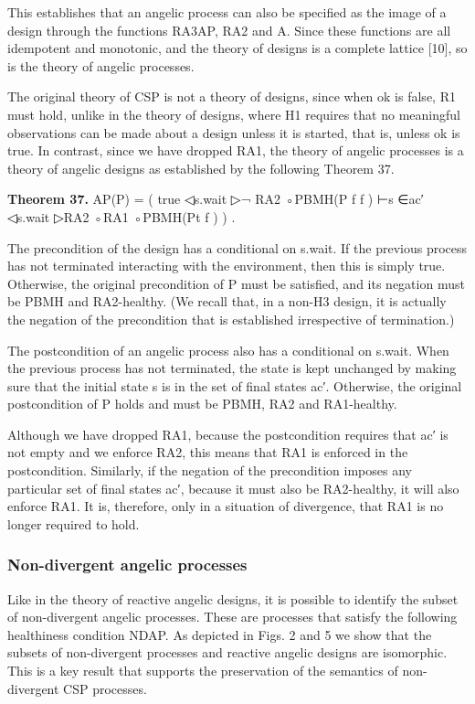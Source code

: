\documentclass[11pt]{article}
\begin{document}
This establishes that an angelic process can also be specified as the image of a design through the functions RA3AP, RA2 and A. Since these functions are all idempotent and monotonic, and the theory of designs is a complete lattice [10], so is the theory of angelic processes.

The original theory of CSP is not a theory of designs, since when ok is false, R1 must hold, unlike in the theory of designs, where H1 requires that no meaningful observations can be made about a design unless it is started, that is, unless ok is true. In contrast, since we have dropped RA1, the theory of angelic processes is a theory of angelic designs as established by the following Theorem 37.

\noindent\textbf{Theorem 37.} AP(P) = ( true ◁s.wait ▷¬ RA2 ◦PBMH(P f f ) ⊢s ∈ac′ ◁s.wait ▷RA2 ◦RA1 ◦PBMH(Pt f ) ) .


The precondition of the design has a conditional on s.wait. If the previous process has not terminated interacting with the environment, then this is simply true. Otherwise, the original precondition of P must be satisfied, and its negation must be PBMH and RA2-healthy. (We recall that, in a non-H3 design, it is actually the negation of the precondition that is established irrespective of termination.)

The postcondition of an angelic process also has a conditional on s.wait. When the previous process has not terminated, the state is kept unchanged by making sure that the initial state s is in the set of final states ac′. Otherwise, the original postcondition of P holds and must be PBMH, RA2 and RA1-healthy.

Although we have dropped RA1, because the postcondition requires that ac′ is not empty and we enforce RA2, this means that RA1 is enforced in the postcondition. Similarly, if the negation of the precondition imposes any particular set of final states ac′, because it must also be RA2-healthy, it will also enforce RA1. It is, therefore, only in a situation of divergence, that RA1 is no longer required to hold.

\subsubsection{Non-divergent angelic processes}
Like in the theory of reactive angelic designs, it is possible to identify the subset of non-divergent angelic processes. These are processes that satisfy the following healthiness condition NDAP. As depicted in Figs. 2 and 5 we show that the subsets of non-divergent processes and reactive angelic designs are isomorphic. This is a key result that supports the preservation of the semantics of non-divergent CSP processes.
\end{document}
